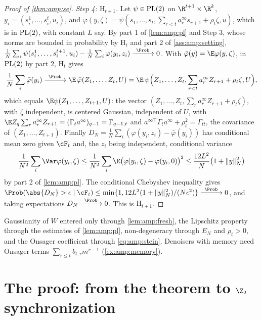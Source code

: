 \begin{refsection}
\begin{proof}[Proof of \cref{thm:amp:se}]
\emph{Step 4: $\mathrm H_{t+1}$.} Let $\psi\in\mathrm{PL}(2)$ on $\R^{t+1}\times\R^k$, $y_i=(s^1_i,\dots,s^t_i,u_i)$, and $\varphi(y,\zeta)=\psi(s_1,\dots,s_t,\sum_{r<t}a^\infty_rs_{r+1}+\rho_t\zeta,u)$, which is in $\mathrm{PL}(2)$, with constant $L$ say. By part 1 of \cref{lem:amp:pl} and Step 3, whose norms are bounded in probability by $\mathrm H_t$ and part 2 of \cref{ass:amp:setting}, $\frac1N\sum_i\psi(s^1_i,\dots,s^{t+1}_i,u_i)-\frac1N\sum_i\varphi(y_i,z_i)\ampto0$. With $\bar\varphi(y)=\E\varphi(y,\zeta)$, in $\mathrm{PL}(2)$ by part 2, $\mathrm H_t$ gives
\[
\frac1N\sum_i\bar\varphi(y_i)\ampto\E\,\bar\varphi(Z_1,\dots,Z_t,U)=\E\,\psi\Bigl(Z_1,\dots,Z_t,\sum_{r<t}a^\infty_rZ_{r+1}+\rho_t\zeta,U\Bigr),
\]
which equals $\E\psi(Z_1,\dots,Z_{t+1},U)$: the vector $(Z_1,\dots,Z_t,\sum_ra^\infty_rZ_{r+1}+\rho_t\zeta)$, with $\zeta$ independent, is centered Gaussian, independent of $U$, with $\E Z_q\sum_ra^\infty_rZ_{r+1}=(\Gamma_ta^\infty)_{q-1}=\Gamma_{q-1,t}$ and $a^{\infty\top}\Gamma_ta^\infty+\rho_t^2=\Gamma_{tt}$, the covariance of $(Z_1,\dots,Z_{t+1})$. Finally $D_N=\frac1N\sum_i(\varphi(y_i,z_i)-\bar\varphi(y_i))$ has conditional mean zero given $\cF_t$ and, the $z_i$ being independent, conditional variance
\[
\frac1{N^2}\sum_i\Var\varphi(y_i,\zeta)\le\frac1{N^2}\sum_i\E\bigl(\varphi(y_i,\zeta)-\varphi(y_i,0)\bigr)^2\le\frac{12L^2}N\bigl(1+\ampnorm y^2\bigr)
\]
by part 2 of \cref{lem:amp:pl}. The conditional Chebyshev inequality gives $\Prob(\abs{D_N}>\epsilon\mid\cF_t)\le\min\{1,12L^2(1+\ampnorm y^2)/(N\epsilon^2)\}\ampto0$, and taking expectations $D_N\ampto0$. This is $\mathrm H_{t+1}$.
\end{proof}

Gaussianity of $W$ entered only through \cref{lem:amp:fresh}, the Lipschitz property through the estimates of \cref{lem:amp:pl}, non-degeneracy through $E_N$ and $\rho_t>0$, and the Onsager coefficient through \eqref{eq:amp:stein}. Denoisers with memory need Onsager terms $\sum_{r\le t}b_{t,r}m^{r-1}$ (\cref{ex:amp:memory}).

\section{The proof: from the theorem to \texorpdfstring{$\Z_2$}{Z2} synchronization}\label{sec:amp:z2}


\end{refsection}
